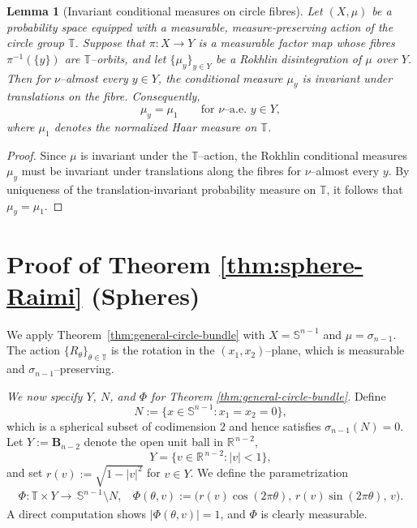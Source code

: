 \documentclass[11pt]{article}
\numberwithin{equation}{section}
\newtheorem{lemma}[theorem]{Lemma}
\theoremstyle{remark}
\begin{document}
\begin{lemma}[Invariant conditional measures on circle fibres]\label{lem:Haar-fibres}
Let $(X,\mu)$ be a probability space equipped with a measurable, measure-preserving action of the circle group $\mathbb{T}$.
Suppose that $\pi:X\to Y$ is a measurable factor map whose fibres $\pi^{-1}(\{y\})$ are $\mathbb{T}$--orbits, and let $\{\mu_y\}_{y\in Y}$ be a Rokhlin disintegration of $\mu$ over $Y$.
Then for $\nu$--almost every $y\in Y$, the conditional measure $\mu_y$ is invariant under translations on the fibre. Consequently,
\[
\mu_y = \mu_1 \qquad \text{for $\nu$--a.e.\ } y\in Y,
\]
where $\mu_1$ denotes the normalized Haar measure on $\mathbb{T}$.
\end{lemma}
\begin{proof}
Since $\mu$ is invariant under the $\mathbb{T}$--action, the Rokhlin
conditional measures $\mu_y$ must be invariant under translations
along the fibres for $\nu$--almost every $y$.
By uniqueness of the translation-invariant probability measure on
$\mathbb{T}$, it follows that $\mu_y=\mu_1$.
\end{proof}




\section{Proof of Theorem \ref{thm:sphere-Raimi} (Spheres)}\label{section-sphere}


We apply Theorem~\ref{thm:general-circle-bundle} with
$X=\mathbb{S}^{n-1}$ and $\mu=\sigma_{n-1}$. The action 
$\{R_\theta\}_{\theta\in \mathbb{T}}$ is the rotation in the $(x_1,x_2)$–plane, which is measurable and $\sigma_{n-1}$–preserving.


\medskip\noindent
\emph{We now specify $Y$, $N$, and $\Phi$ for Theorem \ref{thm:general-circle-bundle}.}
Define
\[
N := \{x\in\mathbb{S}^{n-1} : x_1=x_2=0\},
\]
which is a spherical subset of codimension $2$ and hence satisfies
$\sigma_{n-1}(N)=0$. Let $Y := \mathbf{B}_{n-2}$ denote the open unit ball in $\mathbb{R}^{\,n-2}$,
\[
Y = \{v \in \mathbb{R}^{\,n-2} : |v| < 1\},
\]
and set
$r(v):=\sqrt{1-|v|^2}$ for $v\in Y$.  
We define the parametrization
\begin{align}\label{definition:Phi-sphere}
    \Phi: \mathbb{T} \times Y \to  \, \mathbb{S}^{n-1}\setminus N, ~~~~ \Phi(\theta,v)
 := \big(r(v)\cos(2\pi\theta),\, r(v)\sin(2\pi\theta),\, v\big).
\end{align}
A direct computation shows $|\Phi(\theta,v)|=1$, and $\Phi$ is clearly measurable.
\end{document}
